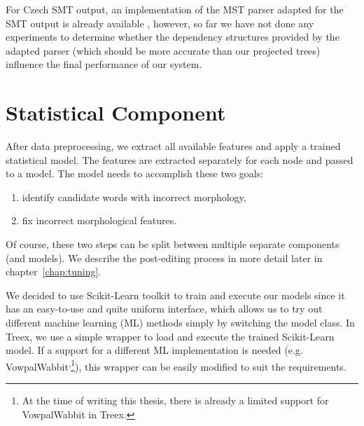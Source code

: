 For Czech SMT output, an implementation of the MST parser adapted for the SMT output
is already available \citep{biblio:RoDuUsingParallel2012}, however, so far we have not done any experiments
to determine whether the dependency structures provided by the adapted parser (which
should be more accurate than our projected trees) influence the final performance of our system.



\section{Statistical Component}

After data preprocessing, we extract all available features and
apply a trained statistical model. The features are extracted separately for each node and passed
to a model. The model needs to accomplish these two goals:
\begin{enumerate}
    \item identify candidate words with incorrect morphology,
    \item fix incorrect morphological features.
\end{enumerate}
Of course, these two steps can be split between multiple separate components (and models).
We describe the post-editing process in more detail later in chapter~\ref{chap:tuning}.

We decided to use Scikit-Learn \citep{scikit-learn} toolkit to train and execute our models since
it has an easy-to-use and quite uniform interface, which allows us to try out different
machine learning (ML) methods simply by switching the model class. In Treex, we use a simple
wrapper to load and execute the trained Scikit-Learn model. If a support for a different ML implementation
is needed (e.g. VowpalWabbit\textsuperscript{,}\footnote{At the time of writing this thesis, there is already
a limited support for VowpalWabbit in Treex.}), this wrapper can be easily modified to suit the requirements.

